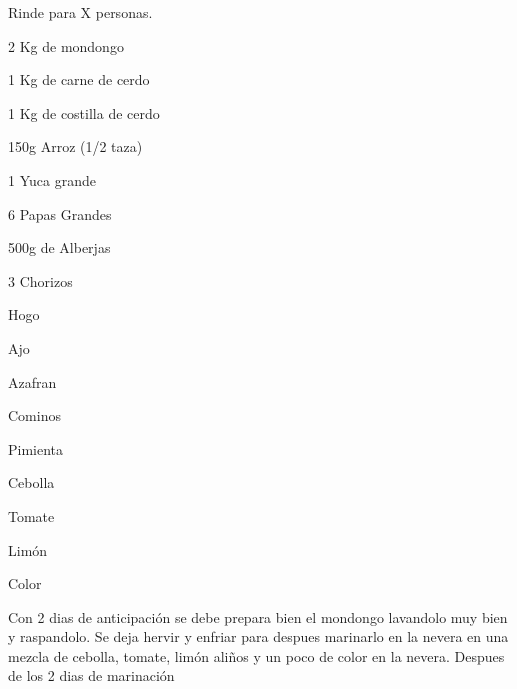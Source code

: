 
Rinde para X personas.

\begin{ingredientes}
\item 2 Kg de mondongo
\item 1 Kg de carne de cerdo
\item 1 Kg de costilla de cerdo
\item 150g Arroz (1/2 taza)
\item 1 Yuca grande
\item 6 Papas Grandes
\item 500g de Alberjas
\item 3 Chorizos
\item Hogo
\item Ajo
\item Azafran
\item Cominos
\item Pimienta
\item Cebolla
\item Tomate
\item Limón
\item Color
\item 
\end{ingredientes}
\preparacion
Con 2 dias de anticipación se debe prepara bien el mondongo lavandolo muy bien y raspandolo. Se deja hervir y enfriar para despues marinarlo en la nevera en una mezcla de cebolla, tomate, limón aliños y un poco de color en la nevera. Despues de los 2 dias de marinación 